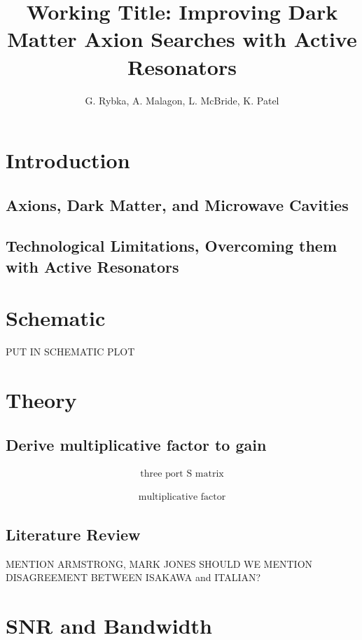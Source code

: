 \documentclass[11pt]{amsart}
\title{Working Title: Improving Dark Matter Axion Searches with Active Resonators}
\author{G. Rybka, A. Malagon, L. McBride, K. Patel}
\date{}                                           %
\begin{document}
\maketitle

\section{Introduction} %

\subsection{Axions, Dark Matter, and Microwave Cavities}

\subsection{Technological Limitations, Overcoming them with Active Resonators}

\section{Schematic}

PUT IN SCHEMATIC PLOT

\section{Theory}

\subsection{Derive multiplicative factor to gain}

\begin{align}
\text{three port S matrix}
\end{align}

\begin{align}
\text{multiplicative factor}
\end{align}

\subsection{Literature Review}

MENTION ARMSTRONG, MARK JONES
SHOULD WE MENTION DISAGREEMENT BETWEEN ISAKAWA and ITALIAN?

\section{SNR and Bandwidth}
\end{document}
